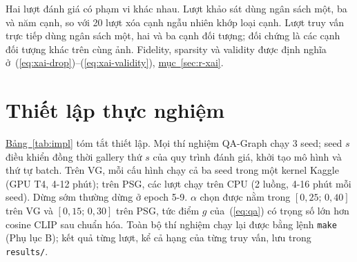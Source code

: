 \documentclass[conference]{IEEEtran}
\begin{document}
Hai lượt đánh giá có phạm vi khác nhau. Lượt khảo sát dùng ngân sách một, ba và năm cạnh, so với 20 lượt xóa cạnh ngẫu nhiên khớp loại cạnh. Lượt truy vấn trực tiếp dùng ngân sách một, hai và ba cạnh đối tượng; đối chứng là các cạnh đối tượng khác trên cùng ảnh. Fidelity, sparsity và validity được định nghĩa ở~(\ref{eq:xai-drop})--(\ref{eq:xai-validity}), \hyperref[sec:r-xai]{mục~\ref*{sec:r-xai}}.

\section{Thiết lập thực nghiệm}\label{sec:setup}
\hyperref[tab:impl]{Bảng~\ref*{tab:impl}} tóm tắt thiết lập. Mọi thí nghiệm QA-Graph chạy 3 seed; seed $s$ điều khiển đồng thời gallery thứ $s$ của quy trình đánh giá, khởi tạo mô hình và thứ tự batch. Trên VG, mỗi cấu hình chạy cả ba seed trong một kernel Kaggle (GPU T4, 4-12 phút); trên PSG, các lượt chạy trên CPU (2 luồng, 4-16 phút mỗi seed). Dừng sớm thường dừng ở epoch 5-9. $\alpha$ chọn được nằm trong $[0{,}25;\,0{,}40]$ trên VG và $[0{,}15;\,0{,}30]$ trên PSG, tức điểm $g$ của~(\ref{eq:qa}) có trọng số lớn hơn cosine CLIP sau chuẩn hóa. Toàn bộ thí nghiệm chạy lại được bằng lệnh \texttt{make} (Phụ lục B); kết quả từng lượt, kể cả hạng của từng truy vấn, lưu trong \texttt{results/}.
\end{document}
